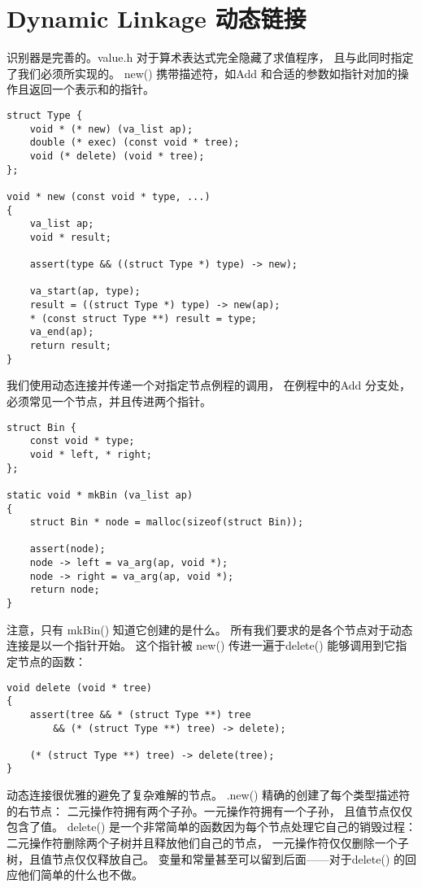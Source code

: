 \section{Dynamic Linkage 动态链接}
 识别器是完善的。value.h 对于算术表达式完全隐藏了求值程序，
 且与此同时指定了我们必须所实现的。 new() 携带描述符，如Add 
 和合适的参数如指针对加的操作且返回一个表示和的指针。
\begin{lstlisting}
struct Type {
    void * (* new) (va_list ap);
    double (* exec) (const void * tree);
    void (* delete) (void * tree);
};
 
void * new (const void * type, ...)
{    
    va_list ap;
    void * result;
    
    assert(type && ((struct Type *) type) -> new);
    
    va_start(ap, type);
    result = ((struct Type *) type) -> new(ap);
    * (const struct Type **) result = type;
    va_end(ap);
    return result;
}
\end{lstlisting}

我们使用动态连接并传递一个对指定节点例程的调用，
在例程中的Add 分支处，必须常见一个节点，并且传进两个指针。
\begin{lstlisting}
struct Bin {
    const void * type;
    void * left, * right;
};   
 
static void * mkBin (va_list ap)
{    
    struct Bin * node = malloc(sizeof(struct Bin));
 
    assert(node);
    node -> left = va_arg(ap, void *);
    node -> right = va_arg(ap, void *);
    return node;
}
\end{lstlisting}

注意，只有 mkBin() 知道它创建的是什么。
所有我们要求的是各个节点对于动态连接是以一个指针开始。
这个指针被 new() 传进一遍于delete() 能够调用到它指定节点的函数：
\begin{lstlisting}
void delete (void * tree)
{
    assert(tree && * (struct Type **) tree
        && (* (struct Type **) tree) -> delete);
 
    (* (struct Type **) tree) -> delete(tree);
}
\end{lstlisting}

动态连接很优雅的避免了复杂难解的节点。
.new() 精确的创建了每个类型描述符的右节点：
二元操作符拥有两个子孙。一元操作符拥有一个子孙，
且值节点仅仅包含了值。
delete() 是一个非常简单的函数因为每个节点处理它自己的销毁过程：
二元操作符删除两个子树并且释放他们自己的节点，
一元操作符仅仅删除一个子树，且值节点仅仅释放自己。
变量和常量甚至可以留到后面——对于delete() 的回应他们简单的什么也不做。


